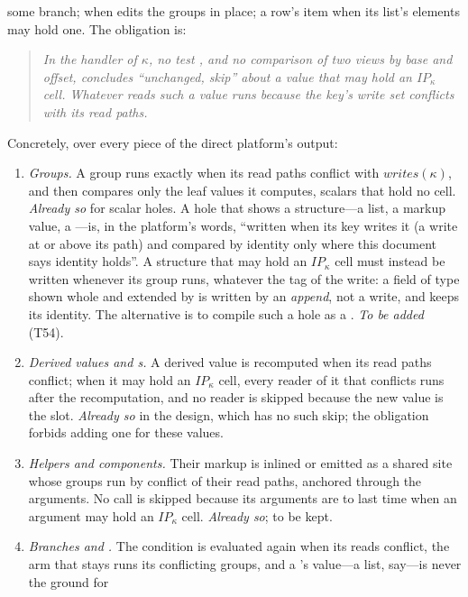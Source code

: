some branch;  when  edits the groups in place; a row's
item when its list's elements may hold one. The obligation is:
\begin{quote}
\emph{In the handler of $\kappa$, no test , and no comparison of two views by base and
offset, concludes ``unchanged, skip'' about a value that may hold an $\mathit{IP}_\kappa$ cell. Whatever
reads such a value runs because the key's write set conflicts with its read paths.}
\end{quote}
Concretely, over every piece of the direct platform's output:
\begin{enumerate}[label=(\alph*)]
\item \emph{Groups.} A group runs exactly when its read paths conflict with $\mathit{writes}(\kappa)$, and
then compares only the leaf values it computes, scalars that hold no cell. \emph{Already so} for scalar
holes. A hole that shows a structure---a list, a markup value, a ---is, in the platform's
words, ``written when its key writes it (a  write at or above its path) and compared by identity
only where this document says identity holds''. A structure that may hold an $\mathit{IP}_\kappa$ cell must
instead be written whenever its group runs, whatever the tag of the write: a field of type
 shown whole and extended by  is written by an
\emph{append}, not a  write, and keeps its identity. The alternative is to compile such a hole
as a . \emph{To be added} (T54).
\item \emph{Derived values and s.} A derived value is recomputed when its read paths conflict;
when it may hold an $\mathit{IP}_\kappa$ cell, every reader of it that conflicts runs after the
recomputation, and no reader is skipped because the new value is \code{===} the slot. \emph{Already so}
in the design, which has no such skip; the obligation forbids adding one for these values.
\item \emph{Helpers and components.} Their markup is inlined or emitted as a shared site whose groups run
by conflict of their read paths, anchored through the arguments. No call is skipped because its
arguments are \code{===} to last time when an argument may hold an $\mathit{IP}_\kappa$ cell.
\emph{Already so}; to be kept.
\item \emph{Branches and .} The condition is evaluated again when its reads conflict, the arm
that stays runs its conflicting groups, and a 's value---a list, say---is never the ground for

\end{enumerate}
